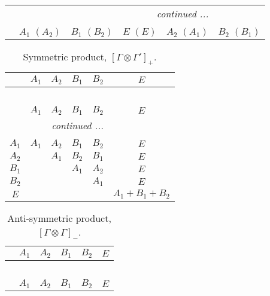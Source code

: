 \documentclass[fleqn,10pt,landscape]{article}
\begin{document}
\begin{itemize}
\begin{center}
\begin{longtable}{cccccc}
 \hline \hline
\multicolumn{5}{r}{\footnotesize\it continued ...} \\ \endfoot

 \hline \hline
\multicolumn{5}{r}{} \\ \endlastfoot

 & $ A_{1}\,\,(A_{2}) $ & $ B_{1}\,\,(B_{2}) $ & $ E\,\,(E) $ & $ A_{2}\,\,(A_{1}) $ & $ B_{2}\,\,(B_{1}) $ \\
\end{longtable}
\end{center}
\begin{center}
\renewcommand{\arraystretch}{1.0}
\begin{longtable}{c|ccccc}
\caption{Symmetric product, $[\Gamma\otimes\Gamma']_+.$}
 \\
 \hline \hline
 & $ A_{1} $ & $ A_{2} $ & $ B_{1} $ & $ B_{2} $ & $ E $ \\ \hline \endfirsthead

\multicolumn{5}{l}{\tablename\ \thetable{}} \\
 \hline \hline
 & $ A_{1} $ & $ A_{2} $ & $ B_{1} $ & $ B_{2} $ & $ E $ \\ \hline \endhead

 \hline \hline
\multicolumn{5}{r}{\footnotesize\it continued ...} \\ \endfoot

 \hline \hline
\multicolumn{5}{r}{} \\ \endlastfoot

$ A_{1} $ & $ A_{1} $ & $ A_{2} $ & $ B_{1} $ & $ B_{2} $ & $ E $ \\
$ A_{2} $ & $  $ & $ A_{1} $ & $ B_{2} $ & $ B_{1} $ & $ E $ \\
$ B_{1} $ & $  $ & $  $ & $ A_{1} $ & $ A_{2} $ & $ E $ \\
$ B_{2} $ & $  $ & $  $ & $  $ & $ A_{1} $ & $ E $ \\
$ E $ & $  $ & $  $ & $  $ & $  $ & $ A_{1} + B_{1} + B_{2} $ \\
\end{longtable}
\end{center}
\begin{center}
\renewcommand{\arraystretch}{1.0}
\begin{longtable}{cccccc}
\caption{Anti-symmetric product, $[\Gamma\otimes\Gamma]_-$.}
 \\
 \hline \hline
 & $ A_{1} $ & $ A_{2} $ & $ B_{1} $ & $ B_{2} $ & $ E $ \\ \hline \endfirsthead

\multicolumn{5}{l}{\tablename\ \thetable{}} \\
 \hline \hline
 & $ A_{1} $ & $ A_{2} $ & $ B_{1} $ & $ B_{2} $ & $ E $ \\ \hline \endhead


\end{longtable}
\end{center}
\end{itemize}
\end{document}
